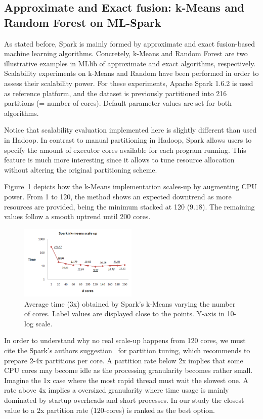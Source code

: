\documentclass[3p,review]{elsarticle}
\begin{document}
\subsection{Approximate and Exact fusion: k-Means and Random Forest on ML-Spark}
\label{subsec:rfspark}

As stated before, Spark is mainly formed by approximate and exact fusion-based machine learning algorithms. Concretely, k-Means and Random Forest are two illustrative examples in MLlib of approximate and exact algorithms, respectively. Scalability experiments on k-Means and Random have been performed in order to assess their scalability power. For these experiments, Apache Spark 1.6.2 is used as reference platform, and the dataset is previously partitioned into 216 partitions (= number of cores). Default parameter values are set for both algorithms.

Notice that scalability evaluation implemented here is slightly different than used in Hadoop. In contrast to manual partitioning in Hadoop, Spark allows users to specify the amount of executor cores available for each program running. This feature is much more interesting since it allows to tune resource allocation without altering the original partitioning scheme.

Figure~\ref{fig:kmeans-spark} depicts how the k-Means implementation scales-up by augmenting CPU power. From 1 to 120, the method shows an expected downtrend as more resources are provided, being the minimum stacked at 120 ($9.18$). The remaining values follow a smooth uptrend until 200 cores. 

\begin{figure}[!htp]
	\centering
	\includegraphics[width=0.5\textwidth]{kmeans-spark}
	\caption{Average time (3x) obtained by Spark's k-Means varying the number of cores. Label values are displayed close to the points. Y-axis in 10-log scale.}
	\label{fig:kmeans-spark}
\end{figure}

In order to understand why no real scale-up happens from 120 cores, we must cite the Spark's authors suggestion~\cite{mllibguide} for partition tuning, which recommends to prepare 2-4x partitions per core. A partition rate below 2x implies that some CPU cores may become idle as the processing granularity becomes rather small. Imagine the 1x case where the most rapid thread must wait the slowest one. A rate above 4x implies a oversized granularity where time usage is mainly dominated by startup overheads and short processes. In our study the closest value to a 2x partition rate (120-cores) is ranked as the best option. 
\end{document}
